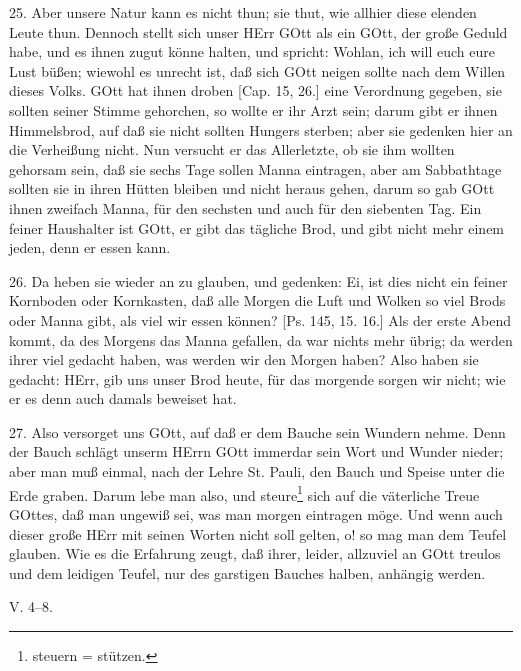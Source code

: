 25. Aber unsere Natur kann es nicht thun; sie thut, wie allhier diese elenden Leute thun. Dennoch stellt sich unser HErr GOtt als ein GOtt, der große Geduld habe, und es ihnen zugut könne halten, und spricht: Wohlan, ich will
euch eure Lust büßen; wiewohl es unrecht ist, daß sich GOtt neigen sollte nach dem Willen dieses Volks. GOtt hat ihnen droben [Cap. 15, 26.] eine Verordnung gegeben, sie sollten seiner Stimme gehorchen, so wollte er ihr Arzt sein; darum gibt er ihnen Himmelsbrod, auf daß sie nicht sollten Hungers sterben; aber sie gedenken hier an die Verheißung nicht. Nun versucht er das Allerletzte, ob sie ihm wollten gehorsam sein, daß sie sechs Tage sollen Manna eintragen, aber am Sabbathtage sollten sie in ihren Hütten bleiben und nicht heraus gehen, darum so gab GOtt ihnen zweifach Manna, für den sechsten und auch für den siebenten Tag. Ein feiner Haushalter ist GOtt, er gibt das tägliche Brod, und gibt nicht mehr einem jeden, denn er essen kann.

26. Da heben sie wieder an zu glauben, und gedenken: Ei, ist dies nicht ein feiner Kornboden oder Kornkasten, daß alle Morgen die Luft und Wolken so viel Brods oder Manna gibt, als viel wir essen können? [Ps. 145, 15. 16.] Als der erste Abend kommt, da des Morgens das Manna gefallen, da war nichts mehr übrig; da werden ihrer viel gedacht haben, was werden wir den Morgen haben? Also haben sie gedacht: HErr, gib uns unser Brod heute, für das morgende sorgen wir nicht; wie er es denn auch damals beweiset hat.

27. Also versorget uns GOtt, auf daß er dem Bauche sein Wundern nehme. Denn der Bauch schlägt unserm HErrn GOtt immerdar sein Wort und Wunder nieder; aber man muß einmal, nach der Lehre St. Pauli, den Bauch und Speise unter die Erde graben. Darum lebe man also, und steure\footnote{steuern = stützen.} sich auf die väterliche Treue GOttes, daß man ungewiß sei, was man morgen eintragen möge. Und wenn auch dieser große HErr mit seinen Worten nicht soll gelten, o! so mag man dem Teufel glauben. Wie es die Erfahrung zeugt, daß ihrer, leider, allzuviel an GOtt treulos und dem leidigen Teufel, nur des garstigen Bauches halben, anhängig werden.

\begin{schriftzitat}
V. 4–8.
\end{schriftzitat}

